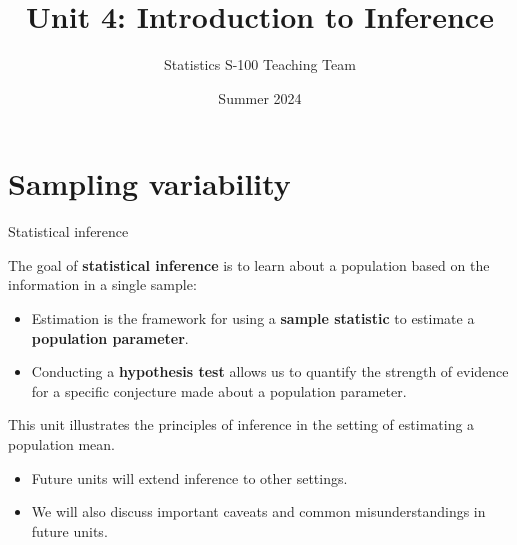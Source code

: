 \documentclass[
  ignorenonframetext,
  aspectratio=169]{beamer}
\title{Unit 4: Introduction to Inference}
\author{Statistics S-100 Teaching Team}
\date{Summer 2024}
\begin{document}
\frame{\titlepage}

\begin{frame}[allowframebreaks]
  \tableofcontents[hideallsubsections]
\end{frame}
\hypertarget{sampling-variability}{%
\section{Sampling variability}\label{sampling-variability}}

\begin{frame}{Statistical inference}
\protect\hypertarget{statistical-inference}{}
\small

The goal of \textbf{statistical inference} is to learn about a
population based on the information in a single sample:

\begin{itemize}
\item
  Estimation is the framework for using a \textbf{sample statistic} to
  estimate a \textbf{population parameter}.
\item
  Conducting a \textbf{hypothesis test} allows us to quantify the
  strength of evidence for a specific conjecture made about a population
  parameter.
\end{itemize}

This unit illustrates the principles of inference in the setting of
estimating a population mean.

\begin{itemize}
\item
  Future units will extend inference to other settings.
\item
  We will also discuss important caveats and common misunderstandings in
  future units.
\end{itemize}
\end{frame}
\end{document}
